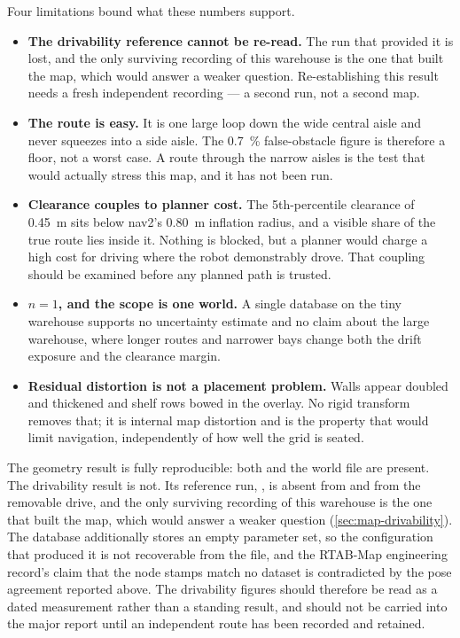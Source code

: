 Four limitations bound what these numbers support.

\begin{itemize}
  \item \textbf{The drivability reference cannot be re-read.} The run that
    provided it is lost, and the only surviving recording of this warehouse is the
    one that built the map, which would answer a weaker question. Re-establishing
    this result needs a fresh independent recording --- a second run, not a second
    map.
  \item \textbf{The route is easy.} It is one large loop down the wide central
    aisle and never squeezes into a side aisle. The \SI{0.7}{\percent} false-obstacle
    figure is therefore a floor, not a worst case. A route through the narrow
    aisles is the test that would actually stress this map, and it has not been
    run.
  \item \textbf{Clearance couples to planner cost.} The 5th-percentile clearance
    of \SI{0.45}{\metre} sits below nav2's \SI{0.80}{\metre} inflation radius, and
    a visible share of the true route lies inside it. Nothing is blocked, but a
    planner would charge a high cost for driving where the robot demonstrably
    drove. That coupling should be examined before any planned path is trusted.
  \item \textbf{$n=1$, and the scope is one world.} A single database on the tiny
    warehouse supports no uncertainty estimate and no claim about the large
    warehouse, where longer routes and narrower bays change both the drift
    exposure and the clearance margin.
  \item \textbf{Residual distortion is not a placement problem.} Walls appear
    doubled and thickened and shelf rows bowed in the overlay. No rigid transform
    removes that; it is internal map distortion and is the property that would
    limit navigation, independently of how well the grid is seated.
\end{itemize}

\begin{queried}
The geometry result is fully reproducible: both  and the
world file are present. The drivability result is not. Its reference run,
, is absent from  and from the
removable drive, and the only surviving recording of this warehouse is the one
that built the map, which would answer a weaker question
(\cref{sec:map-drivability}). The database additionally stores an empty parameter
set, so the configuration that produced it is not recoverable from the file, and
the RTAB-Map engineering record's claim that the node stamps match no dataset is
contradicted by the pose agreement reported above. The drivability figures should
therefore be read as a dated measurement rather than a standing result, and should
not be carried into the major report until an independent route has been recorded
and retained.
\end{queried}

